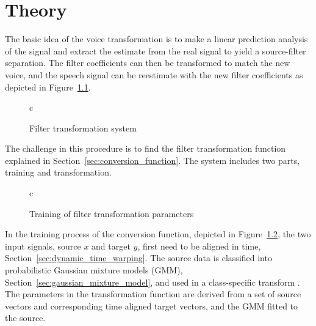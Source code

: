 \chapter{Theory} %
\label{cha:theory}
The basic idea of the voice transformation is to make a linear prediction analysis of the signal and extract the estimate from the real signal to yield a source-filter separation. The filter coefficients can then be transformed to match the new voice, and the speech signal can be reestimate with the new filter coefficients as depicted in Figure~\ref{fig:VC}.
\begin{figure}[htbp]
  \centering
   \begin{tabular}[h]{c}
  \end{tabular}
  \caption{Filter transformation system}
  \label{fig:VC}
\end{figure}

The challenge in this procedure is to find the filter transformation function explained in Section~\ref{sec:conversion_function}. The system includes two parts, training and transformation. 
\begin{figure}[htbp]
	\centering
	\begin{tabular}[h]{c}
	\end{tabular}
	\caption{Training of filter transformation parameters}
	\label{fig:VC_training}
\end{figure}
In the training process of the conversion function, depicted in Figure~\ref{fig:VC_training}, the two input signals, source $x$ and target $y$, first need to be aligned in time, Section~\ref{sec:dynamic_time_warping}. The source data is classified into probabilistic Gaussian mixture models (GMM), Section~\ref{sec:gaussian_mixture_model}, and used in a class-specific transform \cite{stylianou09}. The parameters in the transformation function are derived from a set of source vectors and corresponding time aligned target vectors, and the GMM fitted to the source.


